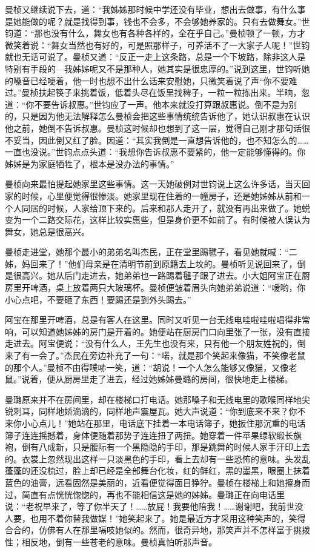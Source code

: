 \par 曼桢又继续说下去，道：“我姊姊那时候中学还没有毕业，想出去做事，有什么事是她能做的呢？就是找得到事，钱也不会多，不会够她养家的。只有去做舞女。”世钧道：“那也没有什么，舞女也有各种各样的，全在乎自己。”曼桢顿了一顿，方才微笑着说：“舞女当然也有好的，可是照那样子，可养活不了一大家子人呢！”世钧就也无话可说了。曼桢又道：“反正一走上这条路，总是一个下坡路，除非这人是特别有手段的—我姊姊呢又不是那种人，她其实是很忠厚的。”说到这里，世钧听她的嗓音已经哽着，他一时也想不出什么话来安慰她，只微笑着说了声“你不要难过。”曼桢扶起筷子来挑着饭，低着头尽在饭里找稗子，一粒一粒拣出来。半晌，忽道：“你不要告诉叔惠。”世钧应了一声。他本来就没打算跟叔惠说。倒不是为别的，只是因为他无法解释怎么曼桢会把这些事情统统告诉他了，她认识叔惠在认识他之前，她倒不告诉叔惠。曼桢这时候却也想到了这一层，觉得自己刚才那句话很不妥当，因此倒又红了脸。因道：“其实我倒是一直想告诉他的，也不知怎么的……一直也没说。”世钧点点头道：“我想你告诉叔惠不要紧的，他一定能够懂得的。你姊姊是为家庭牺牲了，根本是没办法的事情。”
\par 曼桢向来最怕提起她家里这些事情。这一天她破例对世钧说上这么许多话，当天回家的时候，心里便觉得很惨淡。她家里现在住着的一幢房子，还是她姊姊从前和一个人同居的时候，人家给顶下来的。后来和那人走开了，就没有再出来做了。她蜕变为一个二路交际花，这样比较实惠些，但是身价更不如前了。有时候被人误认为舞女，她总是很高兴。
\par 曼桢走进堂，她那个最小的弟弟名叫杰民，正在堂里踢毽子，看见她就喊：“二姊，妈回来了！”他们母亲是在清明节前到原籍去上坟的。曼桢听见说回来了，倒是很高兴。她从后门走进去，她弟弟也一路踢着毽子跟了进去。小大姐阿宝正在厨房里开啤酒，桌上放着两只大玻璃杯。曼桢便皱着眉头向她弟弟说道：“嗳哟，你小心点吧，不要砸了东西！要踢还是到外头踢去。”
\par 阿宝在那里开啤酒，总是有客人在这里。同时又听见一台无线电哇啦哇啦唱得非常响，可以知道她姊姊的房门是开着的。她便站在厨房门口向里张了一张，没有直接走进去。阿宝便说：“没有什么人，王先生也没有来，只有他一个朋友姓祝的，倒来了有一会了。”杰民在旁边补充了一句：“喏，就是那个笑起来像猫，不笑像老鼠的那个人。”曼桢不由得噗哧一笑，道：“胡说！一个人怎么能够又像猫，又像老鼠。”说着，便从厨房里走了进去，经过她姊姊曼璐的房间，很快地走上楼梯。
\par 曼璐原来并不在房间里，却在楼梯口打电话。她那嗓子和无线电里的歌喉同样地尖锐刺耳，同样地娇滴滴的，同样地声震屋瓦。她大声说道：“你到底来不来？你不来你小心点儿！”她站在那里，电话底下挂着一本电话簿子，她扳住那沉重的电话簿子连连摇撼着，身体便随着那势子连连扭了两扭。她穿着一件苹果绿软缎长旗袍，倒有八成新，只是腰际有一个黑隐隐的手印，那是跳舞的时候人家手汗印上去的。衣裳上忽然现出这样一只淡黑色的手印，看上去却有一些恐怖的意味。头发乱蓬蓬的还没梳过，脸上却已经是全部舞台化妆，红的鲜红，黑的墨黑，眼圈上抹着蓝色的油膏，远看固然是美丽的，近看便觉得面目狰狞。曼桢在楼梯上和她擦身而过，简直有点恍恍惚惚的，再也不能相信这是她的姊姊。曼璐正在向电话里说：“老祝早来了，等了你半天了！……放屁！我要他陪我！……谢谢吧，我前世没人要，也用不着你替我做媒！”她笑起来了。她是最近方才采用这种笑声的，笑得合合的，仿佛有人在那里嗝吱她似的。然而，很奇异地，那笑声并不怎样富于挑拨性；相反地，倒有一些苍老的意味。曼桢真怕听那声音。
